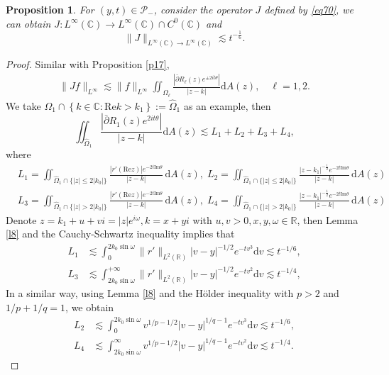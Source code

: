 \documentclass[11pt]{article}
\numberwithin{equation}{section}
\newtheorem{Proposition}{Proposition}
\begin{document}
\begin{Proposition}\label{p28}
    For $(y,t)\in\mathcal{P}_-$, consider the operator $J$ defined by \eqref{eq70},  we can obtain $J : L^\infty(\mathbb{C}) \to L^\infty(\mathbb{C}) \cap C^0(\mathbb{C})$ and
\begin{equation}
    \|J\|_{L^\infty(\mathbb{C}) \to L^\infty(\mathbb{C})} \lesssim t^{-\frac{1}{6}}.
\end{equation}
\end{Proposition}
\begin{proof}
    Similar with Proposition \ref{p17},
    \begin{align*}
\|Jf\|_{L^\infty}\lesssim\|f\|_{L^\infty}\iint_{\Omega_\ell}\frac{|\bar{\partial}R_\ell(z)e^{\pm2it\theta}|}{|z-k|}\mathrm{d}A(z),\quad\ell=1,2.
    \end{align*}
We take $\Omega_1\cap\left\{k\in\mathbb{C}:\mathrm{Re}k>k_1\right\}:=\widehat\Omega_1$ as an example, then
\begin{equation*}
\iint_{\widehat\Omega_1}\frac{|\bar{\partial}R_1(z)e^{2it\theta}|}{|z-k|}\mathrm{d}A(z)\lesssim L_1+L_2+L_3+L_4,
\end{equation*}
where
\begin{align*}
   & L_1=\iint_{\widehat\Omega_1\cap\{|z|\leqslant2|k_0|\}} \frac{|r'(\mathrm{Re}z)| e^{-2t \mathrm{Im} \theta}}{|z-k|}\,\mathrm{d}A(z),\;L_2=\iint_{\widehat\Omega_1\cap\{|z|\leqslant2|k_0|\}}\frac{|z - k_1|^{-\frac{1}{2}} e^{-2t \mathrm{Im} \theta}}{|z-k|} \, \mathrm{d}A(z)\\
   & L_3=\iint_{\widehat\Omega_1\cap\{|z|>2|k_0|\}} \frac{|r'(\mathrm{Re}z)| e^{-2t \mathrm{Im} \theta}}{|z-k|}\,\mathrm{d}A(z),\;L_4=\iint_{\widehat\Omega_1\cap\{|z|>2|k_0|\}}\frac{|z - k_1|^{-\frac{1}{2}} e^{-2t \mathrm{Im} \theta}}{|z-k|} \, \mathrm{d}A(z)
\end{align*}
    Denote $z=k_1+u+vi=|z|e^{i\omega},k=x+yi$ with $u,v>0,x,y,\omega\in\mathbb{R}$, then Lemma \ref{l8} and  the Cauchy-Schwartz inequality implies that
\begin{align*}
L_1&\lesssim\int_0^{2k_0\sin\omega}\|r'\|_{L^2(\mathbb{R})}   |v-y|^{-1/2} e^{-tv^3} \mathrm{d}v   \lesssim t^{-1/6},\\
L_3&\lesssim\int_{2k_0\sin\omega}^{+\infty}\|r'\|_{L^2(\mathbb{R})}   |v-y|^{-1/2} e^{-tv^2} \mathrm{d}v   \lesssim t^{-1/4},
\end{align*}
In a similar way, using Lemma \ref{l8} and   the H\"{o}lder inequality with $p>2$ and $1/p+1/q=1$, we obtain
    \begin{align*}
		 L_2  &\lesssim  \int_{0}^{2k_0\sin\omega} v^{1/p-1/2}|v-y|^{1/q-1}e^{-tv^3} \mathrm{d}v \lesssim t^{-1/6},\\
       L_4  &\lesssim  \int_{2k_0\sin\omega}^\infty v^{1/p-1/2}|v-y|^{1/q-1}e^{-tv^2} \mathrm{d}v \lesssim t^{-1/4}.
	\end{align*}
\end{proof}
\end{document}

